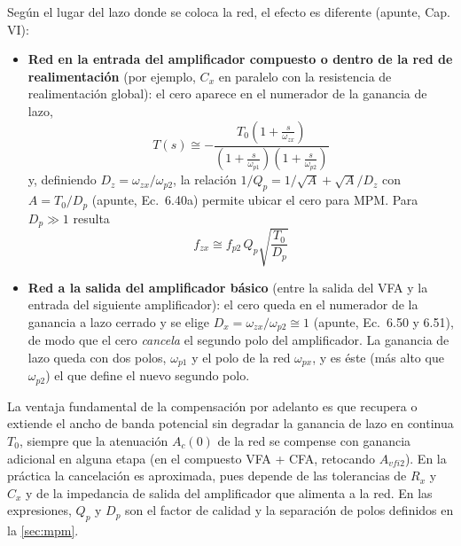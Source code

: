 Según el lugar del lazo donde se coloca la red, el efecto es diferente (apunte, Cap. VI):
\begin{itemize}
    \item \textbf{Red en la entrada del amplificador compuesto o dentro de la red de realimentación} (por ejemplo, $C_x$ en paralelo con la resistencia de realimentación global): el cero aparece en el numerador de la ganancia de lazo,
    \begin{equation}
        T(s) \cong - \frac{T_0 \left(1 + \frac{s}{\omega_{zx}}\right)}{\left(1 + \frac{s}{\omega_{p1}}\right) \left(1 + \frac{s}{\omega_{p2}}\right)}
    \end{equation}
    y, definiendo $D_z = \omega_{zx}/\omega_{p2}$, la relación $1/Q_p = 1/\sqrt{A} + \sqrt{A}/D_z$ con $A = T_0/D_p$ (apunte, Ec.~6.40a) permite ubicar el cero para MPM. Para $D_p \gg 1$ resulta
    \begin{equation}
        f_{zx} \cong f_{p2}\,Q_p\sqrt{\frac{T_0}{D_p}}
    \end{equation}
    \item \textbf{Red a la salida del amplificador básico} (entre la salida del VFA y la entrada del siguiente amplificador): el cero queda en el numerador de la ganancia a lazo cerrado y se elige $D_x = \omega_{zx}/\omega_{p2} \cong 1$ (apunte, Ec.~6.50 y 6.51), de modo que el cero \emph{cancela} el segundo polo del amplificador. La ganancia de lazo queda con dos polos, $\omega_{p1}$ y el polo de la red $\omega_{px}$, y es éste (más alto que $\omega_{p2}$) el que define el nuevo segundo polo.
\end{itemize}

La ventaja fundamental de la compensación por adelanto es que recupera o extiende el ancho de banda potencial sin degradar la ganancia de lazo en continua $T_0$, siempre que la atenuación $A_c(0)$ de la red se compense con ganancia adicional en alguna etapa (en el compuesto VFA + CFA, retocando $A_{vfi2}$). En la práctica la cancelación es aproximada, pues depende de las tolerancias de $R_x$ y $C_x$ y de la impedancia de salida del amplificador que alimenta a la red. En las expresiones, $Q_p$ y $D_p$ son el factor de calidad y la separación de polos definidos en la \autoref{sec:mpm}.
